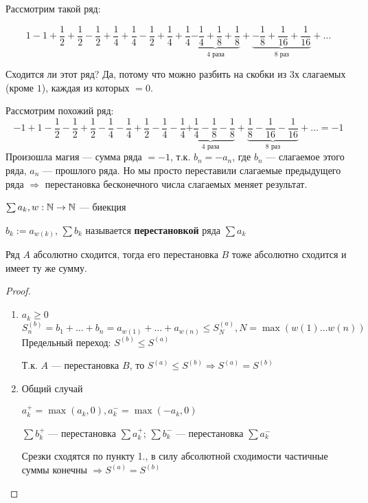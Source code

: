 

\cfoot{}

\renewcommand{\thesubsection}{\arabic{subsection}.}



Рассмотрим такой ряд:

$$1-1+\frac{1}{2}+\frac{1}{2}-\frac{1}{2}+\frac{1}{4}+\frac{1}{4}-\frac{1}{2}+\frac{1}{4}+\frac{1}{4}\underbrace{-\frac{1}{4}+\frac{1}{8}+\frac{1}{8}}_{4 \text{ раза}}+\underbrace{-\frac{1}{8}+\frac{1}{16}+\frac{1}{16}}_{8 \text{ раз}}+\ldots$$

Сходится ли этот ряд? Да, потому что можно разбить на скобки из 3х слагаемых (кроме $1$), каждая из которых $=0$.

Рассмотрим похожий ряд:
$$-1+1-\frac{1}{2}-\frac{1}{2}+\frac{1}{2}-\frac{1}{4}-\frac{1}{4}+\frac{1}{2}-\frac{1}{4}-\frac{1}{4}\underbrace{+\frac{1}{4}-\frac{1}{8}-\frac{1}{8}}_{4 \text{ раза}}+\underbrace{\frac{1}{8}-\frac{1}{16}-\frac{1}{16}}_{8 \text{ раз}}+\ldots=-1$$
Произошла магия --- сумма ряда $=-1$, т.к. $b_n=-a_n$, где $b_n$ --- слагаемое этого ряда, $a_n$ --- прошлого ряда. Но мы просто переставили слагаемые предыдущего ряда $\Rightarrow$ перестановка бесконечного числа слагаемых меняет результат.

\begin{definition}
    $\sum a_k, w:\mathbb{N}\to\mathbb{N}$ --- биекция

    $b_k:=a_{w(k)}$, $\sum b_k$ называется \textbf{перестановкой} ряда $\sum a_k$
\end{definition}
\begin{theorem}
    Ряд $A$ абсолютно сходится, тогда его перестановка $B$ тоже абсолютно сходится и имеет ту же сумму.
\end{theorem}
\begin{proof}
    \begin{enumerate}
        \item $a_k\ge 0$
        $$S_n^{(b)}=b_1+\ldots +b_n=a_{w(1)}+\ldots+a_{w(n)}\le S^{(a)}_N, N=\max(w(1)\ldots w(n))$$
        Предельный переход: $S^{(b)}\le S^{(a)}$

        Т.к. $A$ --- перестановка $B$, то $S^{(a)}\le S^{(b)} \Rightarrow S^{(a)}=S^{(b)}$

        \item Общий случай
        
        $a_k^+=\max(a_k, 0), a_k^-=\max(-a_k, 0)$

        $\sum b_k^+$ --- перестановка $\sum a_k^+$; $\sum b_k^-$ --- перестановка $\sum a_k^-$

        Срезки сходятся по пункту 1., в силу абсолютной сходимости частичные суммы конечны $\Rightarrow S^{(a)}=S^{(b)}$
    \end{enumerate}
\end{proof}

